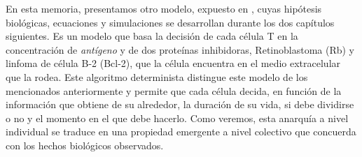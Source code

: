 En esta memoria, presentamos otro modelo, expuesto en \cite{JTB}, cuyas hipótesis biológicas, ecuaciones y simulaciones se desarrollan durante los dos capítulos siguientes. Es un modelo que basa la decisión de cada célula T en la concentración de \textit{antígeno} y de dos proteínas inhibidoras, Retinoblastoma (Rb) y linfoma de célula B-2 (Bcl-2), que la célula encuentra en el medio extracelular que la rodea. Este algoritmo determinista distingue este modelo de los mencionados anteriormente y permite que cada célula decida, en función de la información que obtiene de su alrededor, la duración de su vida, si debe dividirse o no y el momento en el que debe hacerlo. Como veremos, esta anarquía a nivel individual se traduce en una propiedad emergente a nivel colectivo que concuerda con los hechos biológicos observados. 


